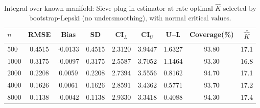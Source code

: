 \begin{table}[!h]
\centering
\small
\caption{Integral over known manifold: Sieve plug-in estimator at rate-optimal $\hat{K}$ selected by bootstrap-Lepski (no undersmoothing), with normal critical values.}
\label{tab:Sim1_Circle_RateOpt}
\begin{tabular}{lcccccccc}
\hline\hline
$n$ & RMSE & Bias & SD & CI$_L$ & CI$_U$ & U--L & Coverage(\%) & $\bar{\hat{K}}$\\
\hline
500 & 0.4515 & -0.0133 & 0.4515 & 2.3120 & 3.9447 & 1.6327 & 93.80 & 17.1\\
1000 & 0.3175 & -0.0097 & 0.3175 & 2.5587 & 3.7052 & 1.1464 & 93.30 & 16.8\\
2000 & 0.2208 & 0.0059 & 0.2208 & 2.7394 & 3.5556 & 0.8162 & 94.70 & 17.1\\
4000 & 0.1626 & 0.0061 & 0.1626 & 2.8591 & 3.4362 & 0.5771 & 93.70 & 17.2\\
8000 & 0.1138 & -0.0042 & 0.1138 & 2.9330 & 3.3418 & 0.4088 & 94.30 & 17.4\\
\hline\hline
\end{tabular}
\end{table}
